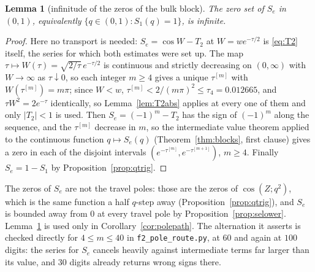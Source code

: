 \documentclass[11pt]{article}
\theoremstyle{plain}
\newtheorem{lemma}[theorem]{Lemma}
\theoremstyle{definition}
\theoremstyle{remark}
\begin{document}
\begin{lemma}[infinitude of the zeros of the bulk block]\label{lem:infzeros}
The zero set of $S_e$ in $(0,1)$, equivalently $\{q\in(0,1):S_1(q)=1\}$, is infinite.
\end{lemma}

\begin{proof}
Here no transport is needed: $S_e=\cos W-T_2$ at $W=we^{-\tau/2}$ is \eqref{eq:T2} itself, the
series for which both estimates were set up. The map
$\tau\mapsto W(\tau)=\sqrt{2/\tau}\,e^{-\tau/2}$ is continuous and strictly decreasing on
$(0,\infty)$ with $W\to\infty$ as $\tau\downarrow0$, so each integer $m\ge4$ gives a unique
$\tau^{[m]}$ with $W(\tau^{[m]})=m\pi$; since $W<w$, $\tau^{[m]}<2/(m\pi)^2\le\tau_4=0.012665$, and
$\tau W^2=2e^{-\tau}$ identically, so Lemma~\ref{lem:T2abs} applies at every one of them and only
$|T_2|<1$ is used. Then $S_e=(-1)^m-T_2$ has the sign of $(-1)^m$ along the sequence, and the
$\tau^{[m]}$ decrease in $m$, so the intermediate value theorem applied to the continuous function
$q\mapsto S_e(q)$ (Theorem~\ref{thm:blocks}, first clause) gives a zero in each of the disjoint
intervals $(e^{-\tau^{[m]}},e^{-\tau^{[m+1]}})$, $m\ge4$. Finally $S_e=1-S_1$ by
Proposition~\ref{prop:qtrig}.
\end{proof}

\noindent The zeros of $S_e$ are not the travel poles: those are the zeros of $\cos(Z;q^2)$, which
is the same function a half $q$-step away (Proposition~\ref{prop:qtrig}), and $S_e$ is bounded away
from $0$ at every travel pole by Proposition~\ref{prop:selower}. Lemma~\ref{lem:infzeros} is used
only in Corollary~\ref{cor:polepath}. The alternation it asserts is checked directly for
$4\le m\le40$ in \texttt{f2\_pole\_route.py}, at $60$ and again at $100$ digits: the series for
$S_e$ cancels heavily against intermediate terms far larger than its value, and $30$ digits already
returns wrong signs there.
\end{document}
